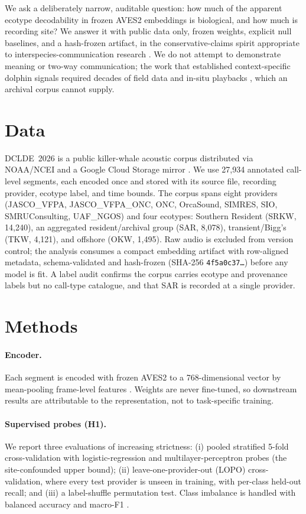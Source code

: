 \documentclass[11pt]{article}
\begin{document}
We ask a deliberately narrow, auditable question: how much of the apparent ecotype
decodability in frozen AVES2 embeddings is biological, and how much is recording site? We
answer it with public data only, frozen weights, explicit null baselines, and a hash-frozen
artifact, in the conservative-claims spirit appropriate to interspecies-communication
research \citep{kershenbaum2024whyanimalstalk}. We do not attempt to demonstrate meaning or
two-way communication; the work that established context-specific dolphin signals required
decades of field data and in-situ playbacks \citep{sayigh2025nsw}, which an archival corpus
cannot supply.

\section{Data}
DCLDE~2026 is a public killer-whale acoustic corpus distributed via NOAA/NCEI and a Google
Cloud Storage mirror \citep{palmer2025dclde,palmer2025dclde_data}. We use 27{,}934 annotated
call-level segments, each encoded once and stored with its source file, recording provider,
ecotype label, and time bounds. The corpus spans eight providers (JASCO\_VFPA,
JASCO\_VFPA\_ONC, ONC, OrcaSound, SIMRES, SIO, SMRUConsulting, UAF\_NGOS)
\citep{orcasound} and four ecotypes: Southern Resident (SRKW, 14{,}240), an aggregated
resident/archival group (SAR, 8{,}078), transient/Bigg's (TKW, 4{,}121), and offshore (OKW,
1{,}495). Raw audio is excluded from version control; the analysis consumes a compact
embedding artifact with row-aligned metadata, schema-validated and hash-frozen
(SHA-256 \texttt{4f5a0c37\ldots}) before any model is fit. A label audit confirms the corpus
carries ecotype and provenance labels but no call-type catalogue, and that SAR is recorded
at a single provider.

\section{Methods}
\paragraph{Encoder.} Each segment is encoded with frozen AVES2 to a 768-dimensional vector by
mean-pooling frame-level features \citep{hagiwara2023aves,chen2022beats}. Weights are never
fine-tuned, so downstream results are attributable to the representation, not to
task-specific training.

\paragraph{Supervised probes (H1).} We report three evaluations of increasing strictness:
(i) pooled stratified 5-fold cross-validation with logistic-regression and
multilayer-perceptron probes (the site-confounded upper bound); (ii) leave-one-provider-out
(LOPO) cross-validation, where every test provider is unseen in training, with per-class
held-out recall; and (iii) a label-shuffle permutation test. Class imbalance is handled with
balanced accuracy and macro-F1 \citep{stowell2022,ghani2023}.
\end{document}
